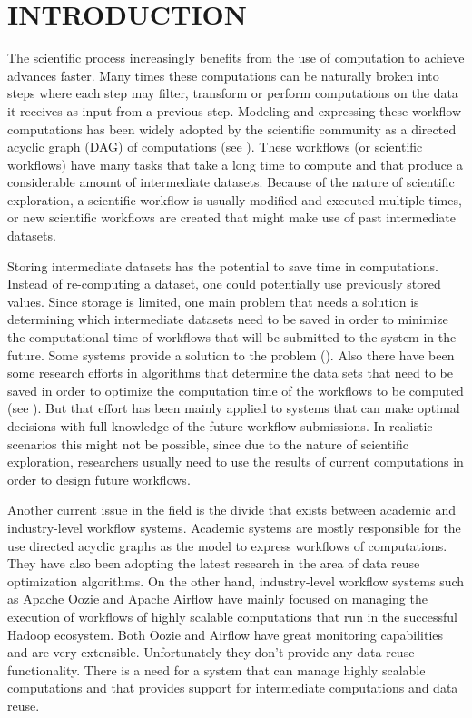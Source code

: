\chapter{INTRODUCTION}
\label{chap:introduction}
The scientific process increasingly benefits from the use of computation to achieve advances faster. Many times these computations can be naturally broken into steps where each step may filter, transform or perform computations on the data it receives as input from a previous step.  Modeling and expressing these workflow computations has been widely adopted by the scientific community as a directed acyclic graph (DAG) of computations (see \cite{liu2015survey}).  These workflows (or scientific workflows) have many tasks that take a long time to compute and that produce a considerable amount of intermediate datasets.  Because of the nature of scientific exploration, a scientific workflow is usually modified and executed multiple times, or new scientific workflows are created that might make use of past intermediate datasets.  

Storing intermediate datasets has the potential to save time in computations. Instead of re-computing a dataset, one could potentially use previously stored values. Since storage is limited, one main problem that needs a solution is determining which intermediate datasets need to be saved in order to minimize the computational time of workflows that will be submitted to the system in the future. Some systems provide a solution to the problem (\cite{yuan2012data}). Also there have been some research efforts in algorithms that determine the data sets that need to be saved in order to optimize the computation time of the workflows to be computed (see \cite{zohrevandi2013bounded}). But that effort has been mainly applied to systems that can make optimal decisions with full knowledge of the future workflow submissions.  In realistic scenarios this might not be possible, since due to the nature of scientific exploration, researchers usually need to use the results of current computations in order to design future workflows.

Another current issue in the field is the divide that exists between academic and industry-level workflow systems.  Academic systems are mostly responsible for the use directed acyclic graphs as the model to express workflows of computations.  They have also been adopting the latest research in the area of data reuse optimization algorithms.  On the other hand, industry-level workflow systems such as Apache Oozie and Apache Airflow have mainly focused on managing the execution of workflows of highly scalable computations that run in the successful Hadoop ecosystem. Both Oozie and Airflow have great monitoring capabilities and are very extensible. Unfortunately they don't provide any data reuse functionality.  There is a need for a system that can manage highly scalable computations and that provides support for intermediate computations and data reuse.

